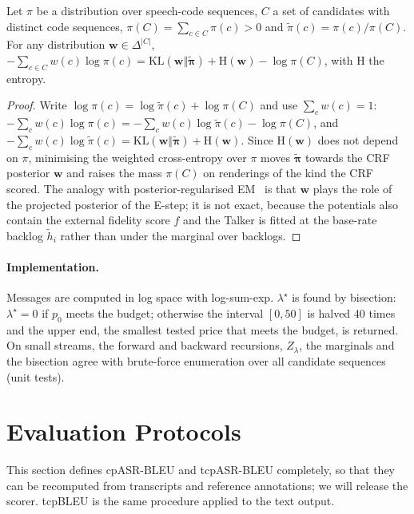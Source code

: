 \begin{proposition}
\label{prop:patrain}
Let $\pi$ be a distribution over speech-code sequences, $C$ a set of candidates with distinct code sequences,
$\pi(C)=\sum_{c\in C}\pi(c)>0$ and $\tilde{\pi}(c)=\pi(c)/\pi(C)$. For any distribution $\bm{w}\in\Delta^{|C|}$,
$-\sum_{c\in C}w(c)\log\pi(c)=\mathrm{KL}(\bm{w}\Vert\tilde{\bm{\pi}})+\mathrm{H}(\bm{w})-\log\pi(C)$, with $\mathrm{H}$ the
entropy.
\end{proposition}

\begin{proof}
Write $\log\pi(c)=\log\tilde{\pi}(c)+\log\pi(C)$ and use $\sum_cw(c)=1$:
$-\sum_cw(c)\log\pi(c)=-\sum_cw(c)\log\tilde{\pi}(c)-\log\pi(C)$, and
$-\sum_cw(c)\log\tilde{\pi}(c)=\mathrm{KL}(\bm{w}\Vert\tilde{\bm{\pi}})+\mathrm{H}(\bm{w})$.
Since $\mathrm{H}(\bm{w})$ does not depend on $\pi$, minimising the weighted cross-entropy over $\pi$ moves
$\tilde{\bm{\pi}}$ towards the CRF posterior $\bm{w}$ and raises the mass $\pi(C)$ on renderings of the kind the CRF scored.
The analogy with posterior-regularised EM~\citep{ganchev2010posterior} is that $\bm{w}$ plays the role of the projected
posterior of the E-step; it is not exact, because the potentials also contain the external fidelity score $f$ and the
Talker is fitted at the base-rate backlog $\tilde h_i$ rather than under the marginal over backlogs.
\end{proof}

\paragraph{Implementation.} Messages are computed in log space with log-sum-exp. $\lambda^\star$ is found by bisection:
$\lambda^\star=0$ if $p_0$ meets the budget; otherwise the interval $[0,50]$ is halved 40 times and the upper end, the
smallest tested price that meets the budget, is returned. On small streams, the forward and backward recursions,
$Z_\lambda$, the marginals and the bisection agree with brute-force enumeration over all candidate sequences (unit tests).

\section{Evaluation Protocols}
\label{app:eval}
\label{app:metrics}
\label{app:prereg}

This section defines cpASR-BLEU and tcpASR-BLEU completely, so that they can be recomputed from transcripts and
reference annotations; we will release the scorer. tcpBLEU is the same procedure applied to the text output.

